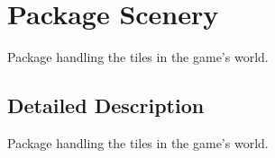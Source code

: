 \hypertarget{namespace_scenery}{\section{Package Scenery}
\label{namespace_scenery}
}


Package handling the tiles in the game's world.  




\subsection{Detailed Description}
Package handling the tiles in the game's world. 